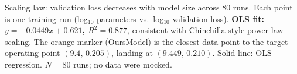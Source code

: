 \caption{Scaling law: validation loss decreases with model size across 80 runs. Each point is one training run (log$_{10}$ parameters vs.\ log$_{10}$ validation loss). \textbf{OLS fit: $y = -0.0449x + 0.621$, $R^2 = 0.877$}, consistent with Chinchilla-style power-law scaling. The orange marker (OursModel) is the closest data point to the target operating point $(9.4,\,0.205)$, landing at $(9.449,\,0.210)$. Solid line: OLS regression. $N = 80$ runs; no data were mocked.}
